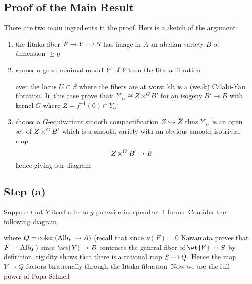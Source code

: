 \documentclass[12pt]{article}
\begin{document}
\subsection{Proof of the Main Result}

There are two main ingredients in the proof. Here is a sketch of the argument:

\begin{enumerate}
\item the Iitaka fiber $F \to Y \rat S$ has image in $A$ an abelian variety $B$ of dimension $\ge g$
\item choose a good minimal model $Y'$ of $Y$ then the Iitaka fibration
\begin{center}
\end{center}
over the locus $U \subset S$ where the fibers are at worst klt is a (weak) Calabi-Yau fibration. In this case prove that: $Y'_U \cong Z \times^G B'$ for an isogeny $B' \to B$ with kernel $G$ where $Z = f^{-1}(0) \cap Y_U'$
\item choose a $G$-equivariant smooth compactification $Z \hookrightarrow \overline{Z}$ thus $Y'_U$ is an open set of $\overline{Z} \times^G B'$ which is a smooth variety with an obvious smooth isotrivial map
\[ \overline{Z} \times^G B' \to B \]
hence giving our diagram
\begin{center}
\end{center}
\end{enumerate}

\subsection{Step (a)}

Suppose that $Y$ itself admits $g$ poinwise independent $1$-forms. Consider the following diagram,

\begin{center}
\end{center}
where $Q = \operatorname{\mathrm{coker}}{(\mathrm{Alb}_F \to A)}$ (recall that since $\kappa(F) = 0$ Kawamata proves that $F \twoheadrightarrow \mathrm{Alb}_F$)
since $\wt{Y} \to B$ contracts the general fiber of $\wt{Y} \to S$ by definition, rigidity shows that there is a rational map $S \rat Q$. Hence the map $Y \to Q$ factors birationally through the Iitaka fibration. Now we use the full power of Popa-Schnell
\end{document}

